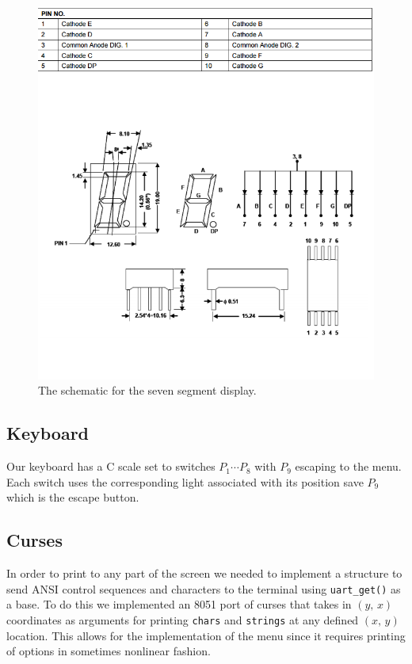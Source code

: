 \documentclass[12pt]{article}
\newcommand{\shellcmd}[1]{\texttt{\colorbox{gray!30}{#1}}}
\begin{document}
\begin{figure}[!ht]
    \includegraphics[width=\textwidth]{assets/scematic}
    \caption{The schematic for the seven segment display.}
    \label{schematic}
\end{figure}

\subsection{Keyboard}
Our keyboard has a C scale set to switches $P_1 \cdots P_8$ with $P_9$ escaping to the menu. Each switch uses the corresponding light associated with its position save $P_9$ which is the escape button.

\subsection{Curses}
In order to print to any part of the screen we needed to implement a structure to send ANSI control sequences and characters to the terminal using \shellcmd{uart\_get()} as a base. To do this we implemented an \num{8051} port of curses that takes in $(y,\, x)$ coordinates as arguments for printing \shellcmd{chars} and \shellcmd{strings} at any defined $(x,\, y)$ location. This allows for the implementation of the menu since it requires printing of options in sometimes nonlinear fashion.
\end{document}
